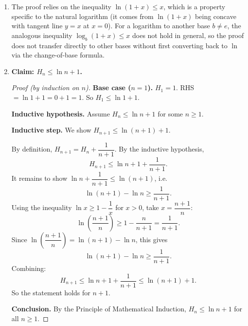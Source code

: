 \begin{solbox}[long]
\begin{solution}
\begin{enumerate}
\item The proof relies on the inequality $\ln(1+x)\le x$, which is a
    property specific to the natural logarithm (it comes from
    $\ln(1+x)$ being concave with tangent line $y=x$ at $x=0$). For a
    logarithm to another base $b\ne e$, the analogous inequality
    $\log_b(1+x)\le x$ does not hold in general, so the proof does
    not transfer directly to other bases without first converting
    back to $\ln$ via the change-of-base formula.

\item \textbf{Claim: $H_n \le \ln n+1$.}
    \begin{proof}[Proof (by induction on $n$)]
        \textbf{Base case ($n=1$).} $H_1=1$. RHS $=\ln1+1=0+1=1$.
        So $H_1\le\ln1+1$.

        \textbf{Inductive hypothesis.} Assume $H_n\le\ln n+1$ for
        some $n\ge1$.

        \textbf{Inductive step.} We show $H_{n+1}\le\ln(n+1)+1$.

        By definition, $H_{n+1}=H_n+\dfrac{1}{n+1}$. By the
        inductive hypothesis,
        \[
            H_{n+1} \le \ln n+1+\frac{1}{n+1}.
        \]
        It remains to show $\ln n+\dfrac{1}{n+1}\le\ln(n+1)$, i.e.
        \[
            \ln(n+1)-\ln n \ge \frac{1}{n+1}.
        \]
        Using the inequality $\ln x \ge 1-\dfrac1x$ for $x>0$, take
        $x=\dfrac{n+1}{n}$:
        \[
            \ln\left(\frac{n+1}{n}\right) \ge 1-\frac{n}{n+1}
            = \frac{1}{n+1}.
        \]
        Since $\ln\left(\dfrac{n+1}{n}\right)=\ln(n+1)-\ln n$, this
        gives
        \[
            \ln(n+1)-\ln n \ge \frac{1}{n+1}.
        \]
        Combining:
        \[
            H_{n+1} \le \ln n+1+\frac{1}{n+1} \le \ln(n+1)+1.
        \]
        So the statement holds for $n+1$.

        \textbf{Conclusion.} By the Principle of Mathematical
        Induction, $H_n \le \ln n+1$ for all $n\ge1$.
    \end{proof}
\end{enumerate}
\end{solution}
\end{solbox}


